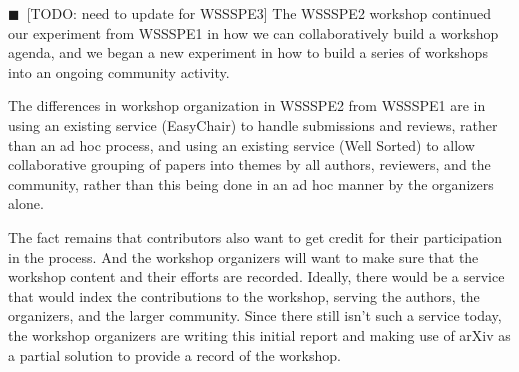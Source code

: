 \documentclass[11pt, oneside]{amsart}
\newcommand{\todo}[1]{{\color{blue}$\blacksquare$~\textsf{[TODO: #1]}}}
\begin{document}
\todo{need to update for WSSSPE3}
The WSSSPE2 workshop continued our experiment from WSSSPE1 in how we can
collaboratively build a workshop agenda, and we began a new experiment in
how to build a series of workshops into an ongoing community activity.

The differences in workshop organization in WSSSPE2 from WSSSPE1
are in using an existing service (EasyChair) to handle submissions and reviews,
rather than an ad hoc process, and using an existing service (Well Sorted) to
allow collaborative grouping of papers into themes by all authors, reviewers,
and the community, rather than this being done in an ad hoc manner by the
organizers alone.

The fact remains that contributors also want to get credit for their
participation in the process. And the workshop organizers will want to make
sure that the workshop content and their efforts are recorded. Ideally, there
would be a service that would index the contributions to the
workshop, serving the authors, the organizers, and the larger community. 
Since there still isn't such a service today, the workshop organizers are
writing this initial report and making use of arXiv as a partial solution to
provide a record of the workshop.
\end{document}
